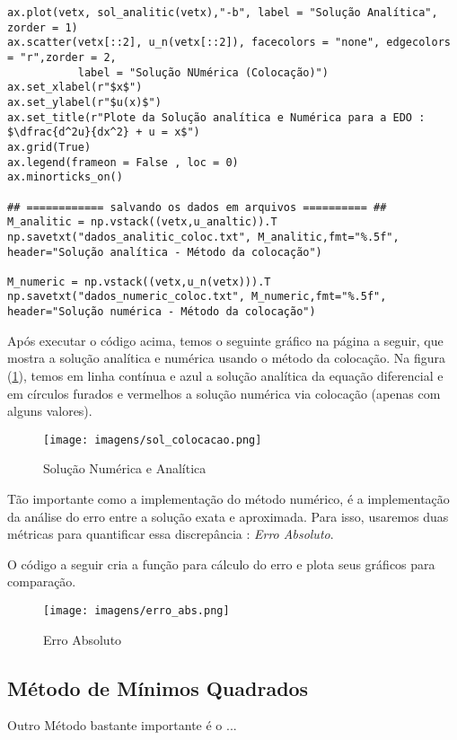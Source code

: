 \documentclass[a4paper, 12pt]{article}
\numberwithin{equation}{section}
\begin{document}
\begin{lstlisting}
ax.plot(vetx, sol_analitic(vetx),"-b", label = "Solução Analítica", zorder = 1)
ax.scatter(vetx[::2], u_n(vetx[::2]), facecolors = "none", edgecolors = "r",zorder = 2,
           label = "Solução NUmérica (Colocação)")
ax.set_xlabel(r"$x$")
ax.set_ylabel(r"$u(x)$")
ax.set_title(r"Plote da Solução analítica e Numérica para a EDO : $\dfrac{d^2u}{dx^2} + u = x$")
ax.grid(True)
ax.legend(frameon = False , loc = 0)
ax.minorticks_on() 

## ============ salvando os dados em arquivos ========== ## 
M_analitic = np.vstack((vetx,u_analtic)).T 
np.savetxt("dados_analitic_coloc.txt", M_analitic,fmt="%.5f", header="Solução analítica - Método da colocação")

M_numeric = np.vstack((vetx,u_n(vetx))).T 
np.savetxt("dados_numeric_coloc.txt", M_numeric,fmt="%.5f", header="Solução numérica - Método da colocação")

\end{lstlisting}


Após executar o código acima, temos o seguinte gráfico na página a seguir, que mostra a solução analítica e numérica usando o método da colocação. Na figura (\ref{fig:colocacao}), temos em linha contínua e azul a solução analítica da equação diferencial e em círculos furados e vermelhos a solução numérica via colocação (apenas com alguns valores). 



\begin{figure}[!htp]
    \centering
    \texttt{[image: imagens/sol\_colocacao.png]}
    \caption{Solução Numérica e Analítica}
    \label{fig:colocacao}
\end{figure}


Tão importante como a implementação do método numérico, é a implementação da análise do erro entre a solução exata e aproximada. Para isso, usaremos duas métricas para quantificar essa discrepância : \textit{Erro Absoluto}.

O código a seguir cria a função para cálculo do erro e plota seus gráficos para comparação. 

\begin{figure}[H]
    \centering
    \texttt{[image: imagens/erro\_abs.png]}
    \caption{Erro Absoluto}
    \label{fig:err_abs}
\end{figure}


\vspace{2cm}



\subsection{Método de Mínimos Quadrados}

Outro Método bastante importante é o ...


\newpage 


\end{document}
